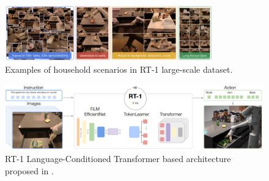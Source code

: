 \begin{figure}[t]
    \centering
    \includegraphics[width=0.8\textwidth]{figures/images/rt_1/dataset_image.png}
    \caption{Examples of household scenarios in RT-1 large-scale dataset.}
    \label{fig:rt_1_dataset}
\end{figure}

\begin{figure}[t]
    \centering
    \includegraphics[width=\textwidth]{figures/images/rt_1/model.png}
    \caption{RT-1 Language-Conditioned Transformer based architecture proposed in \cite{brohan2022rt}.}
    \label{fig:rt_1_model}
\end{figure}